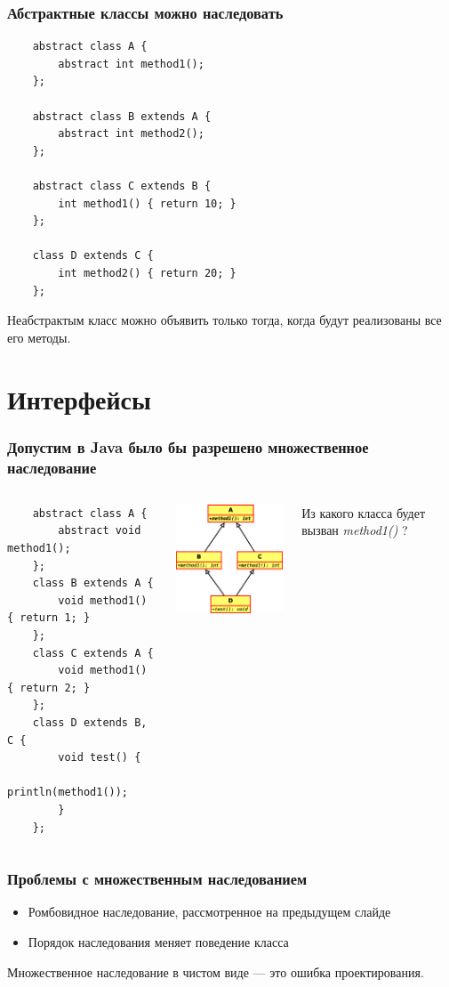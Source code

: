\begin{frame}[fragile]
	\frametitle{Абстрактные классы можно наследовать}
	\begin{verbatim}
	abstract class A {
	    abstract int method1();
	};

	abstract class B extends A {
	    abstract int method2();
	};

	abstract class C extends B {
	    int method1() { return 10; }
	};

	class D extends C {
	    int method2() { return 20; }
	};
	\end{verbatim}

	Неабстрактым класс можно объявить только тогда, когда будут реализованы все его методы.
\end{frame}

\section{Интерфейсы}
\begin{frame}[fragile]
	\frametitle{Допустим в Java было бы разрешено множественное наследование}

	\begin{columns}[c]
	\column{2.55in}
	\begin{verbatim}
	abstract class A {
	    abstract void method1();
	};
	class B extends A {
	    void method1() { return 1; }
	};
	class C extends A {
	    void method1() { return 2; }
	};
	class D extends B, C {
	    void test() {
	        println(method1());
	    }
	};
	\end{verbatim}
	\column{1.90in}
	\includegraphics[width=1.9in]{lesson-7-Diagram1.eps}

	\smallskip
	Из какого класса будет вызван \emph{method1()} ?
	\end{columns}
\end{frame}

\begin{frame}[fragile]
	\frametitle{Проблемы с множественным наследованием}
	\begin{large}
	\begin{itemize}
	\item{Ромбовидное наследование, рассмотренное на предыдущем слайде}
	\item{Порядок наследования меняет поведение класса}
	\end{itemize}

	Множественное наследование в чистом виде --- это ошибка проектирования.
	\end{large}
\end{frame}



